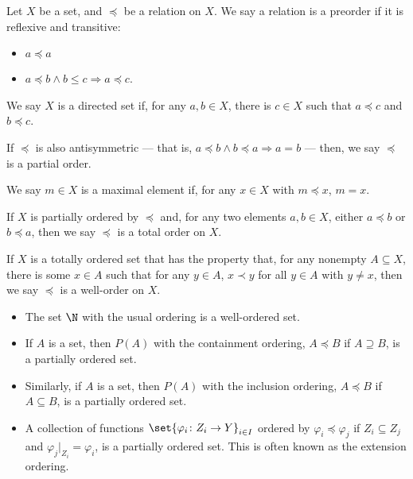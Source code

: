 \begin{definition}
Let $X$ be a set, and $\preceq $ be a relation on $X$. We say a relation is a preorder if it is reflexive and transitive:
\begin{itemize}
  \item $a\preceq a$
  \item $a\preceq b \wedge b\leq c\Rightarrow a\preceq c$.
\end{itemize}
We say $X$ is a directed set if, for any $a,b\in X$, there is $c\in X$ such that $a\preceq c$ and $b\preceq c$.\newline

If $\preceq$ is also antisymmetric --- that is, $a\preceq b\wedge b\preceq a \Rightarrow a = b$ --- then, we say $\preceq$ is a partial order.\newline

We say $m\in X$ is a maximal element if, for any $x\in X$ with $m\preceq x$, $m = x$.\newline

If $X$ is partially ordered by $\preceq$ and, for any two elements $a,b\in X$, either $a\preceq b$ or $b\preceq a$, then we say $\preceq$ is a total order on $X$.\newline

If $X$ is a totally ordered set that has the property that, for any nonempty $A\subseteq X$, there is some $x\in A$ such that for any $y\in A$, $x\prec y$ for all $y \in A$ with $y\neq x$, then we say $\preceq$ is a well-order on $X$.
\end{definition}
\begin{example}\hfill
  \begin{itemize}
    \item The set $\N$ with the usual ordering is a well-ordered set.
    \item If $A$ is a set, then $P(A)$ with the containment ordering, $A\preceq B$ if $A\supseteq B$, is a partially ordered set.
    \item Similarly, if $A$ is a set, then $P(A)$ with the inclusion ordering, $A\preceq B$ if $A\subseteq B$, is a partially ordered set.
    \item A collection of functions $\set{\varphi_{i}\colon Z_i\rightarrow Y}_{i\in I}$ ordered by $\varphi_{i}\preceq \varphi_j$ if $Z_i\subseteq Z_j$ and $\varphi_{j}|_{Z_i} = \varphi_i$, is a partially ordered set. This is often known as the extension ordering.
  \end{itemize}
\end{example}


